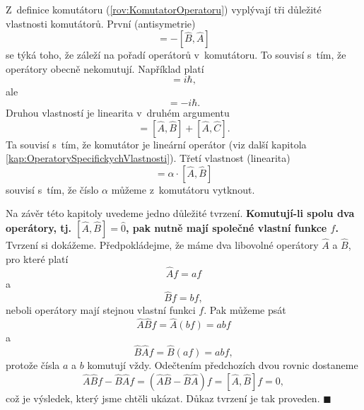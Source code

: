 Z~definice komutátoru (\ref{rov:KomutatorOperatoru}) vyplývají tři důležité vlastnosti komutátorů. První (antisymetrie)
\begin{equation}
[\hat{A},\hat{B}] = -[\hat{B},\hat{A}]
\label{rov:VlastnostKomutatoru1}
\end{equation}
se týká toho, že záleží na pořadí operátorů v~komutátoru. To souvisí s~tím, že operátory obecně nekomutují. Například platí
\begin{equation}
[\hat{r},\hat{p}]= i \hbar,
\nonumber
\end{equation}
ale
\begin{equation}
[\hat{p},\hat{r}]= - i \hbar.
\nonumber
\end{equation}
Druhou vlastností je linearita v~druhém argumentu
\begin{equation}
[\hat{A},\hat{B}+\hat{C}] = [\hat{A},\hat{B}] + [\hat{A},\hat{C}].
\label{rov:VlastnostKomutatoru2}
\end{equation}
Ta souvisí s~tím, že komutátor je lineární operátor (viz další kapitola \ref{kap:OperatorySpecifickychVlastnosti}). Třetí vlastnost (linearita)
\begin{equation}
[\alpha \cdot \hat{A},\hat{B}] = \alpha \cdot [\hat{A},\hat{B}]
\label{rov:VlastnostKomutatoru3}
\end{equation}
souvisí s~tím, že číslo $\alpha$ můžeme z~komutátoru vytknout.

Na závěr této kapitoly uvedeme jedno důležité tvrzení. \textbf{Komutují-li spolu dva operátory, tj. $[\hat{A},\hat{B}]=\hat{0}$, pak nutně mají společné vlastní funkce $f$.} Tvrzení si dokážeme. Předpokládejme, že máme dva libovolné operátory $\hat{A}$ a $\hat{B}$, pro které platí
\begin{equation}
\hat{A} f = a f
\nonumber
\end{equation}
a
\begin{equation}
\hat{B} f = b f,
\nonumber
\end{equation}
neboli operátory mají stejnou vlastní funkci $f$. Pak můžeme psát
\begin{equation}
\hat{A}\hat{B} f = \hat{A} (b f) = a b f
\nonumber
\end{equation}
a 
\begin{equation}
\hat{B}\hat{A} f = \hat{B} (a f) = a b f,
\nonumber
\end{equation}
protože čísla $a$ a $b$ komutují vždy. Odečtením předchozích dvou rovnic dostaneme
\begin{equation}
\hat{A}\hat{B} f - \hat{B}\hat{A} f  = (\hat{A}\hat{B} - \hat{B}\hat{A} ) f = [\hat{A}, \hat{B}] f = 0,
\nonumber
\end{equation}
což je výsledek, který jsme chtěli ukázat. Důkaz tvrzení je tak proveden. \hfill {\footnotesize $\blacksquare$}


